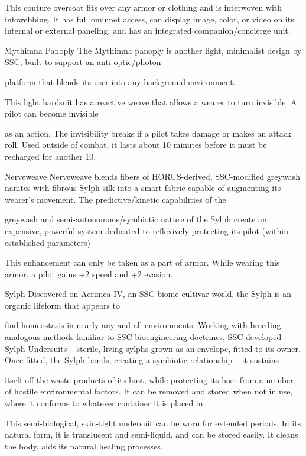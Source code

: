 This couture overcoat fits over any armor or clothing and is interwoven with infowebbing. It has full  
ominnet access, can display image, color, or video on its internal or external paneling, and has an  
integrated companion/concierge unit. 
 

Mythimna Panoply  
The Mythimna panoply is another light, minimalist design by SSC, built to support an anti-optic/photon  

platform that blends its user into any background environment.   

This light hardsuit has a reactive weave that allows a wearer to turn invisible. A pilot can become invisible  

as an action. The invisibility breaks if a pilot takes damage or makes an attack roll. Used outside of  
combat, it lasts about 10 minutes before it must be recharged for another 10.
 

Nerveweave  
Nerveweave blends fibers of HORUS-derived, SSC-modified greywash nanites with fibrous Sylph silk into a  
smart fabric capable of augmenting its wearer’s movement. The predictive/kinetic capabilities of the  

greywash and semi-autonomous/symbiotic nature of the Sylph create an expensive, powerful system  
dedicated to reflexively protecting its pilot (within established parameters)  
 

This enhancement can only be taken as a part of armor. While wearing this armor, a pilot gains +2 speed  
and +2 evasion.
 

Sylph  
Discovered on Acrimea IV, an SSC biome cultivar world, the Sylph is an organic lifeform that appears to  

find homeostasis in nearly any and all environments. Working with breeding-analogous methods familiar to  
SSC bioengineering doctrines, SSC developed Sylph Undersuits -- sterile, living sylphs grown as an  
envelope, fitted to its owner. Once fitted, the Sylph bonds, creating a symbiotic relationship -- it sustains  

itself off the waste products of its host, while protecting its host from a number of hostile environmental  
factors. It can be removed and stored when not in use, where it conforms to whatever container it is placed  
in.  

This semi-biological, skin-tight undersuit can be worn for extended periods. In its natural form, it is  
translucent and semi-liquid, and can be stored easily. It cleans the body, aids its natural healing processes,  


